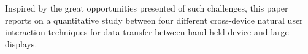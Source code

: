Inspired by the great opportunities presented of such challenges, this paper reports on a quantitative study between four different cross-device natural user interaction techniques for data transfer between hand-held device and large displays. %

